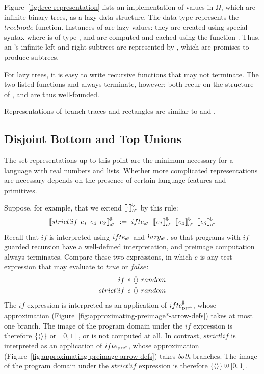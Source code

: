 Figure~\ref{fig:tree-representation} lists an implementation of values in $\Omega$, which are infinite binary trees, as a lazy data structure.
The  data type represents the $tree!node$ function.
Instances of  are lazy values: they are created using special syntax  where  is of type , and are computed and cached using the function .
Thus, an 's infinite left and right subtrees are represented by , which are promises to produce subtrees.

For lazy trees, it is easy to write recursive functions that may not terminate.
The two listed functions  and  always terminate, however: both recur on the structure of , and are thus well-founded.

Representations of branch traces and rectangles are similar to  and .

\subsection{Disjoint Bottom and Top Unions}

The set representations up to this point are the minimum necessary for a language with real numbers and lists.
Whether more complicated representations are necessary depends on the presence of certain language features and primitives.

Suppose, for example, that we extend $\left\llbracket{\cdot}\right\rrbracket^{\mspace{-2mu}\Downarrow\mspace{-2mu}}_\mathrm{a^{\mspace{-2mu}*}}$ by this rule:
\begin{equation}
	\meaningofconv{strict!if~\mathit{e_1}~\mathit{e_2}~\mathit{e_3}}\genc\ :=\ 
		\arrowif\genc
			~\meaningofconv{\mathit{e_1}}\genc
			~\meaningofconv{\mathit{e_2}}\genc
			~\meaningofconv{\mathit{e_3}}\genc
\end{equation}
Recall that $if$ is interpreted using $ifte_\mathrm{a^{\mspace{-2mu}*}}$ and $lazy_\mathrm{a^{\mspace{-2mu}*}}$, so that programs with $if$-guarded recursion have a well-defined interpretation, and preimage computation always terminates.
Compare these two expressions, in which $\mathit{e}$ is any test expression that may evaluate to $true$ or $false$:
\begin{equation}
\begin{aligned}
	if~&\mathit{e}~\langle{}\rangle~random \\
	strict!if~&\mathit{e}~\langle{}\rangle~random \\
\end{aligned}
\end{equation}
The $if$ expression is interpreted as an application of $ifte^{\mspace{-2mu}\Downarrow\mspace{-2mu}}_\mathrm{pre^{\mspace{-2mu}*}}$, whose approximation (Figure~\ref{fig:approximating-preimage*-arrow-defs}) takes at most one branch.
The image of the program domain under the $if$ expression is therefore $\{{\langle{}\rangle}\}$ or $[0,1]$, or is not computed at all.
In contrast, $strict!if$ is interpreted as an application of $ifte_\mathrm{pre^{\mspace{-2mu}*}}$, whose approximation (Figure~\ref{fig:approximating-preimage-arrow-defs}) takes \emph{both} branches.
The image of the program domain under the $strict!if$ expression is therefore $\{{\langle{}\rangle}\} \uplus [0,1]$.

